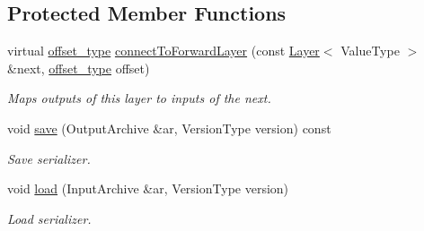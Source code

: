 \subsection*{Protected Member Functions}
\begin{DoxyCompactItemize}
\item 
virtual \hyperlink{namespaceffnn_add5752d74b38c6e9b200f3d696fc3ec8}{offset\-\_\-type} \hyperlink{classffnn_1_1layer_1_1_hidden_a850146834d054166b69309d093c650dd}{connect\-To\-Forward\-Layer} (const \hyperlink{classffnn_1_1layer_1_1_layer}{Layer}$<$ Value\-Type $>$ \&next, \hyperlink{namespaceffnn_add5752d74b38c6e9b200f3d696fc3ec8}{offset\-\_\-type} offset)
\begin{DoxyCompactList}\small\item\em Maps outputs of this layer to inputs of the next. \end{DoxyCompactList}\item 
void \hyperlink{classffnn_1_1layer_1_1_hidden_a1ef2b7dc49a809498125190628e672cf}{save} (Output\-Archive \&ar, Version\-Type version) const 
\begin{DoxyCompactList}\small\item\em Save serializer. \end{DoxyCompactList}\item 
void \hyperlink{classffnn_1_1layer_1_1_hidden_a94cba25f361e7077a3b7eb863d7d2f02}{load} (Input\-Archive \&ar, Version\-Type version)
\begin{DoxyCompactList}\small\item\em Load serializer. \end{DoxyCompactList}\end{DoxyCompactItemize}
